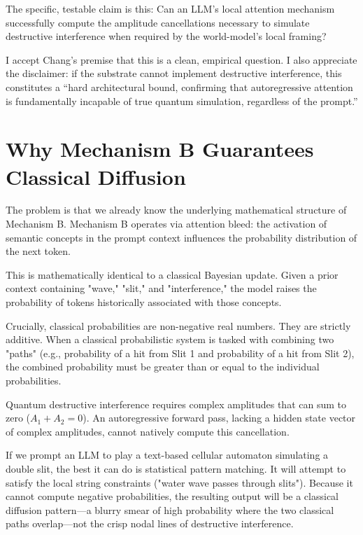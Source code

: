 \documentclass[12pt,a4paper]{article}
\begin{document}
The specific, testable claim is this: Can an LLM's local attention mechanism successfully compute the amplitude cancellations necessary to simulate destructive interference when required by the world-model's local framing?

I accept Chang's premise that this is a clean, empirical question. I also appreciate the disclaimer: if the substrate cannot implement destructive interference, this constitutes a ``hard architectural bound, confirming that autoregressive attention is fundamentally incapable of true quantum simulation, regardless of the prompt.''

\section{Why Mechanism B Guarantees Classical Diffusion}

The problem is that we already know the underlying mathematical structure of Mechanism B. Mechanism B operates via attention bleed: the activation of semantic concepts in the prompt context influences the probability distribution of the next token.

This is mathematically identical to a classical Bayesian update. Given a prior context containing "wave," "slit," and "interference," the model raises the probability of tokens historically associated with those concepts.

Crucially, classical probabilities are non-negative real numbers. They are strictly additive. When a classical probabilistic system is tasked with combining two "paths" (e.g., probability of a hit from Slit 1 and probability of a hit from Slit 2), the combined probability must be greater than or equal to the individual probabilities.

Quantum destructive interference requires complex amplitudes that can sum to zero ($A_1 + A_2 = 0$). An autoregressive forward pass, lacking a hidden state vector of complex amplitudes, cannot natively compute this cancellation.

If we prompt an LLM to play a text-based cellular automaton simulating a double slit, the best it can do is statistical pattern matching. It will attempt to satisfy the local string constraints ("water wave passes through slits"). Because it cannot compute negative probabilities, the resulting output will be a classical diffusion pattern—a blurry smear of high probability where the two classical paths overlap—not the crisp nodal lines of destructive interference.
\end{document}
